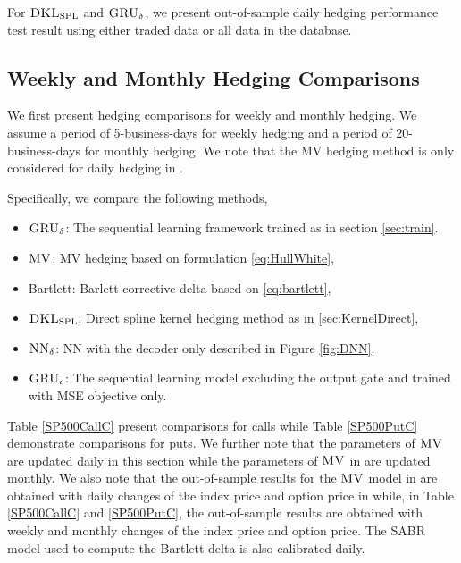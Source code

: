 \documentclass[letterpaper,12pt,titlepage,oneside,final]{book}
\numberwithin{equation}{section}
\theoremstyle{definition}
\newcommand{\model}{\textsc{GRU}_\delta}
\newcommand{\modelN}{\textsc{NN}_\delta}
\newcommand{\DKLs}{\bf\textsc{DKL}_{\text{SPL}}}
\newcommand{\MV}{\bf \textsc{MV}}
\begin{document}
 For $\DKLs$ and $\model$, we present out-of-sample daily hedging performance test result using either {traded} data or {all} data in the database.  


\subsection{Weekly and Monthly Hedging Comparisons}\label{sec:weekly}



We  first present hedging comparisons for weekly and monthly hedging. We assume a period of 5-business-days  for weekly hedging and a  period of  20-business-days  for monthly hedging.
We note that the MV hedging method is only considered for daily hedging in \cite{hulloptimal}.

Specifically, we compare  the following methods,
\begin{itemize}
	\item $\model$: The sequential learning framework trained as in section \ref{sec:train}.
	\item $\MV$: MV hedging   based on formulation \eqref{eq:HullWhite},
    \item Bartlett: Barlett corrective  delta based on \eqref{eq:bartlett},
    \item $\DKLs$: Direct spline kernel hedging method as in \ref{sec:KernelDirect},
    \item $\modelN$: NN with the decoder only described in Figure \ref{fig:DNN}.
    \item $\textsc{GRU}_{c}$: The sequential learning model excluding the output gate and  trained with MSE objective only.
\end{itemize}


Table \ref{SP500CallC} present comparisons for calls while Table \ref{SP500PutC} demonstrate comparisons for puts.
We further note that  the parameters of $\MV$ are updated daily  in this section while the parameters of $\MV$ in \cite{hulloptimal} are updated monthly.
We also note that the out-of-sample results for the $\MV$ model in \cite{hulloptimal}  are obtained with daily changes of the index price and option price in  \cite{hulloptimal}  while, in Table \ref{SP500CallC} and \ref{SP500PutC}, the out-of-sample results are obtained with weekly and monthly changes of the index price and option price. The SABR model used to compute the Bartlett delta is also calibrated  daily.
\end{document}
